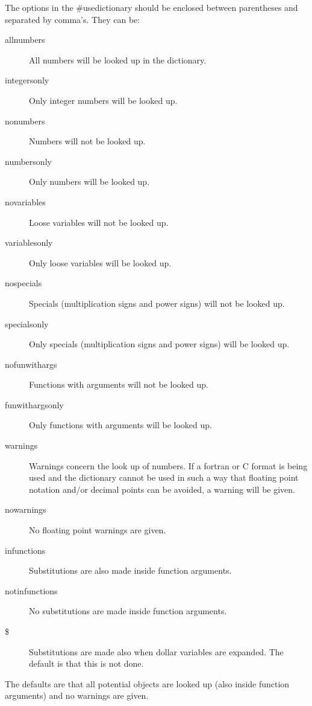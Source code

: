 The options in the \#usedictionary should be enclosed between parentheses 
and separated by comma's. They can be:
\begin{description}
\item[allnumbers]    All numbers will be looked up in the dictionary.
\item[integersonly]  Only integer numbers will be looked up.
\item[nonumbers]     Numbers will not be looked up.
\item[numbersonly]   Only numbers will be looked up.
\item[novariables]   Loose variables will not be looked up.
\item[variablesonly] Only loose variables will be looked up.
\item[nospecials]    Specials (multiplication signs and power signs) will 
not be looked up.
\item[specialsonly]  Only specials (multiplication signs and power signs) will 
be looked up.
\item[nofunwithargs] Functions with arguments will not be looked up.
\item[funwithargsonly] Only functions with arguments will be looked up.
\item[warnings]      Warnings concern the look up of 
numbers. If a fortran or C format is being used and the dictionary cannot 
be used in such a way that floating point notation and/or decimal points 
can be avoided, a warning will be given.
\item[nowarnings]    No floating point warnings are given.
\item[infunctions]   Substitutions are also made inside function arguments.
\item[notinfunctions] No substitutions are made inside function arguments.
\item[\$] Substitutions are made also when dollar variables are expanded. 
The default is that this is not done.
\end{description}
The defaults are that all potential objects are looked up (also inside 
function arguments) and no warnings are given.

